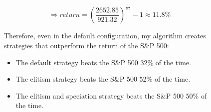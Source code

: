 \begin{figure}[p]
    \begin{equation}
        \Rightarrow return = {(\frac{2652.85}{921.32})}^{\frac{1}{9.5}} - 1 \approx 11.8\%
    \end{equation}
    
    Therefore, even in the default configuration, my algorithm creates strategies that outperform the return of the S\&P 500:
    \begin{itemize}
        \item The default strategy beats the S\&P 500 32\% of the time.
        \item The elitism strategy beats the S\&P 500 52\% of the time.
        \item The elitism and speciation strategy beats the S\&P 500 50\% of the time.
    \end{itemize}
    
\end{figure}